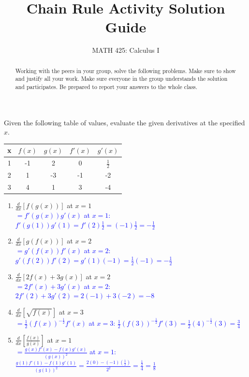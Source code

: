 \documentclass{ximera}
\title{Chain Rule Activity Solution Guide}  %
\author{MATH 425: Calculus I}
\begin{document}
\begin{abstract}
    Working with the peers in your group, solve the following problems. Make sure to show and justify all your work. Make sure everyone in the group understands the solution and participates. Be prepared to report your answers to the whole class. 
\end{abstract}
\maketitle


\begin{exercise}
    Given the following table of values, evaluate the given derivatives at the specified $x$.\\
    \begin{tabular}{c|c|c|c|c}
        x & $f(x)$ & $g(x)$ & $f'(x)$ & $g'(x)$  \\ \hline
        1 & -1 & 2 & 0 & $\frac{1}{2}$\\
        2 & 1 & -3 & -1 & -2 \\
        3 & 4 & 1 & 3 & -4 
    \end{tabular}
    \begin{enumerate}
        \item[a.] $\frac{d}{dx}[f(g(x))]$ at $x=1$\\
        \textcolor{blue}{ $=f'(g(x))g'(x)$ at $x=1$: $f'(g(1))g'(1)=f'(2)\frac12=(-1)\frac12=-\frac12$}

        \item[b.] $\frac{d}{dx}[g(f(x))]$ at $x=2$\\
        \textcolor{blue}{ $=g'(f(x))f'(x)$ at $x=2$: $g'(f(2))f'(2)=g'(1)(-1)=\frac12(-1)=-\frac12$}

        \item[c.] $\frac{d}{dx}[2f(x)+3g(x)]$ at $x=2$\\
        \textcolor{blue}{ $=2f'(x)+3g'(x)$ at $x=2$: $2f'(2)+3g'(2)=2(-1)+3(-2)=-8$}

        \item[d.] $\frac{d}{dx}[\sqrt{f(x)}]$ at $x=3$\\
        \textcolor{blue}{ $=\frac12(f(x))^{-\frac12}f'(x)$ at $x=3$: $\frac12(f(3))^{-\frac12}f'(3)=\frac12(4)^{-\frac12}(3)=\frac34$}

        \item[e.] $\frac{d}{dx}[\frac{f(x)}{g(x)}]$ at $x=1$\\
        \textcolor{blue}{ $=\frac{g(x)f'(x)-f(x)g'(x)}{(g(x))^2}$ at $x=1$: $\frac{g(1)f'(1)-f(1)g'(1)}{(g(1))^2}=\frac{2(0)-(-1)(\frac12)}{2^2}=\frac{\frac{1}{2}}{4}=\frac18$}


\end{enumerate}
\end{exercise}
\end{document}
